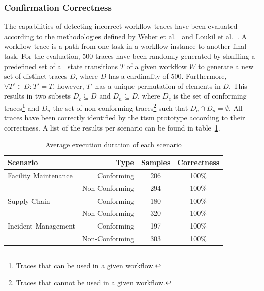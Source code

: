 \subsubsection{Confirmation Correctness}
\label{sec:evaluation:simulations:confirmation_correctness}
The capabilities of detecting incorrect workflow traces have been evaluated according to the methodologies defined by Weber et al.~\cite{untrusted_bp_execution_using_blockchain} and Loukil et al.~\cite{interpreted_bp_on_blockchain_loukil}. A workflow trace is a path from one task in a workflow instance to another final task. For the evaluation, 500 traces have been randomly generated by shuffling a predefined set of all state transitions $T$ of a given workflow $W$ to generate a new set of distinct traces $D$, where $D$ has a cardinality of 500. Furthermore, $\forall T' \in D: T' = T$, however, $T'$ has a unique permutation of elements in $D$. This results in two subsets $D_{c} \subseteq D$ and $D_{n} \subseteq D$, where $D_{c}$ is the set of conforming traces\footnote{Traces that can be used in a given workflow.} and $D_{n}$ the set of non-conforming traces\footnote{Traces that cannot be used in a given workflow.} such that $D_{c} \cap D_{n} = \emptyset$. All traces have been correctly identified by the \gls{ttsm} prototype according to their correctness. A list of the results per scenario can be found in table~\ref{tab:evaluation:simulations:confirmation_correctness}.

\begin{table}[h]
\centering
\begin{tabular}{|l|r|c|c|}
    \hline
    \textbf{Scenario} & \textbf{Type} & \textbf{Samples} & \textbf{Correctness} \\
    \hline
    Facility Maintenance & Conforming     & 206 & 100\% \\
                         & Non-Conforming & 294 & 100\% \\
    Supply Chain         & Conforming     & 180 & 100\% \\
                         & Non-Conforming & 320 & 100\% \\
    Incident Management  & Conforming     & 197 & 100\% \\
                         & Non-Conforming & 303 & 100\% \\
    \hline
\end{tabular}
\caption{Average execution duration of each scenario}
\label{tab:evaluation:simulations:confirmation_correctness}
\end{table}

